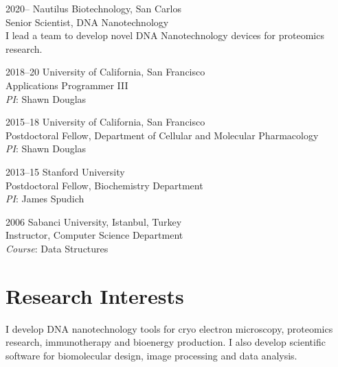 \documentclass[12pt,letterpaper]{report}
\newcommand{\listitemspace}{0.25em}
\renewenvironment{itemize}
{\begin{list}{}{\setlength{\leftmargin}{0em}
                \setlength{\parskip}{0em}
                \setlength{\itemsep}{\listitemspace}
                \setlength{\parsep}{\listitemspace}}}
{\end{list}}
\begin{document}
    \begin{tablist}

        \item[2020--]   \tab{}Nautilus Biotechnology, San Carlos \\
                             Senior Scientist, DNA Nanotechnology\\
                             I lead a team to develop novel DNA Nanotechnology devices for proteomics research.

        \item[2018--20] \tab{}University of California, San Francisco \\
                             Applications Programmer III \\
                             \textit{PI}: Shawn Douglas

        \item[2015--18]\tab{}University of California, San Francisco \\
                             Postdoctoral Fellow, Department of Cellular and Molecular Pharmacology \\
                             \textit{PI}: Shawn Douglas

        \item[2013--15]\tab{}Stanford University \\
                             Postdoctoral Fellow, Biochemistry Department \\
                             \textit{PI}: James Spudich
        \item[2006]\tab{}Sabanci University, Istanbul, Turkey \\
                             Instructor, Computer Science Department\\
                             \textit{Course}: Data Structures

    \end{tablist}

    \section*{Research Interests}

    \begin{itemize}

        \item I develop DNA nanotechnology tools for cryo electron microscopy, proteomics research, immunotherapy and bioenergy production. I also develop scientific software for biomolecular design, image processing and data analysis.

    \end{itemize}
\end{document}
